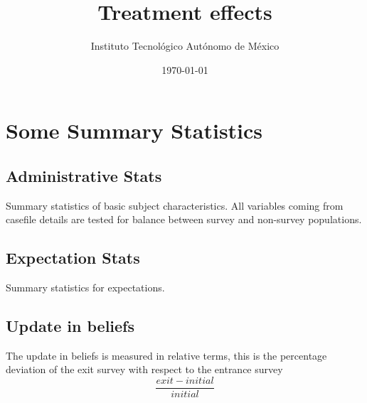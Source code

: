 \documentclass[12pt]{article}
\theoremstyle{named}
\newcommand{\folder}{./Effect}
\begin{document}
\title{Treatment effects}

\author{Instituto Tecnológico Autónomo de México}
\date{\today}
\maketitle


\hrulefill


\section{Some Summary Statistics}

\vspace{7mm}

\subsection*{Administrative Stats}

Summary statistics of basic subject characteristics. All variables coming from casefile details are tested for balance between survey and non-survey populations.

\begin{center}
\scriptsize{}
\end{center}


\pagebreak

\begin{center}
\scriptsize{}
\end{center}

\begin{center}
\scriptsize{}
\end{center}

\subsection*{Expectation Stats}

Summary statistics for expectations.

\begin{center}
\scriptsize{}
\end{center}

\pagebreak

\subsection*{Update in beliefs}

The update in beliefs is measured in relative terms, this is the percentage deviation of the exit survey with respect to the entrance survey
\[\frac{exit-initial}{initial}\]
\end{document}
